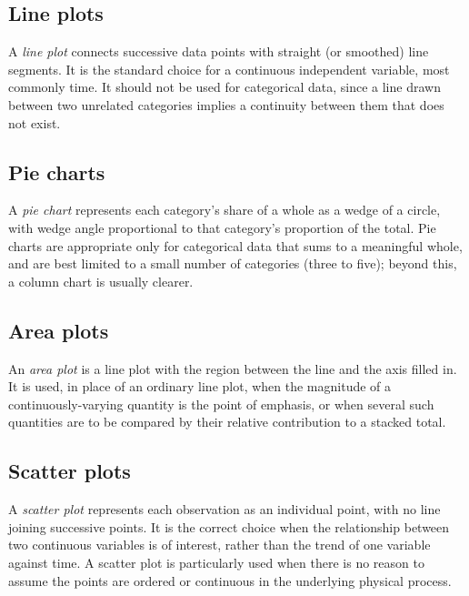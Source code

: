 	\subsection{Line plots}
		A \emph{line plot} connects successive data points with straight (or smoothed) line segments. It is the standard choice for a continuous independent variable, most commonly time. It should not be used for categorical data, since a line drawn between two unrelated categories implies a continuity between them that does not exist.
	
	\subsection{Pie charts}
		A \emph{pie chart} represents each category's share of a whole as a wedge of a circle, with wedge angle proportional to that category's proportion of the total. Pie charts are appropriate only for categorical data that sums to a meaningful whole, and are best limited to a small number of categories (three to five); beyond this, a column chart is usually clearer.
	
	\subsection{Area plots}
		An \emph{area plot} is a line plot with the region between the line and the axis filled in. It is used, in place of an ordinary line plot, when the magnitude of a continuously-varying quantity is the point of emphasis, or when several such quantities are to be compared by their relative contribution to a stacked total.
	
	\subsection{Scatter plots}
		A \emph{scatter plot} represents each observation as an individual point, with no line joining successive points. It is the correct choice when the relationship between two continuous variables is of interest, rather than the trend of one variable against time. A scatter plot is particularly used when there is no reason to assume the points are ordered or continuous in the underlying physical process.